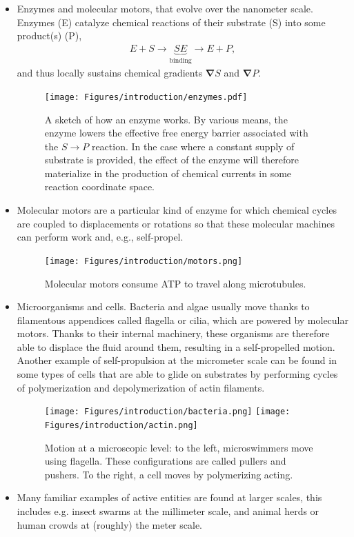 \begin{itemize}
    \item Enzymes and molecular motors, that evolve over the nanometer scale. Enzymes (E) catalyze chemical reactions of their substrate (S) into some product(s) (P),
    \begin{align}
        E + S \longrightarrow  \underbrace{SE}_{\mathrm{binding}} \longrightarrow  E + P,
    \end{align}
     and thus locally sustains chemical gradients $\bm \nabla S$ and $\bm \nabla P$. 
     \begin{figure}[H]
        \centering
        \texttt{[image: Figures/introduction/enzymes.pdf]}
        \caption{A sketch of how an enzyme works. By various means, the enzyme lowers the effective free energy barrier associated with the $S \to P$ reaction. In the case where a constant supply of substrate is provided, the effect of the enzyme will therefore materialize in the production of chemical currents in some reaction coordinate space.}
        \label{fig: enzymes}
    \end{figure}
    \item Molecular motors are a particular kind of enzyme for which chemical cycles are coupled to displacements or rotations so that these molecular machines can perform work and, e.g., self-propel.
     \begin{figure}[!h]
        \centering
        \texttt{[image: Figures/introduction/motors.png]}
        \caption{Molecular motors consume ATP to travel along microtubules.}
        \label{fig: motors}
     \end{figure}
    \item Microorganisms and cells. Bacteria and algae usually move thanks to filamentous appendices called flagella or cilia, which are powered by molecular motors.
    Thanks to their internal machinery, these organisms are therefore able to displace the fluid around them, resulting in a self-propelled motion.
    Another example of self-propulsion at the micrometer scale can be found in some types of cells that are able to glide on substrates by performing cycles of polymerization and depolymerization of actin filaments.
    \begin{figure}[!h]
        \centering
        \texttt{[image: Figures/introduction/bacteria.png]} 
        \hspace{2cm}
        \texttt{[image: Figures/introduction/actin.png]}
        \caption{Motion at a microscopic level: to the left, microswimmers move using flagella. These configurations are called pullers and pushers. To the right, a cell moves by polymerizing acting.}
        \label{fig: label}
    \end{figure}
    \item Many familiar examples of active entities are found at larger scales, this includes e.g. insect swarms at the millimeter scale, and animal herds or human crowds at (roughly) the meter scale.
\end{itemize}


